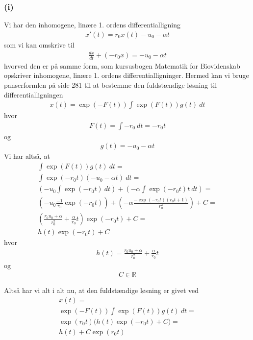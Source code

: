 \documentclass[12pt]{article}
\begin{document}
\subsubsection{(i)}

Vi har den inhomogene, linære 1. ordens differentialligning
\begin{align}
x'(t) = r_0x(t) - u_0 - \alpha t
\end{align}
som vi kan omskrive til  
\begin{align}
\frac{dx}{dt} + (-r_0 x) = - u_0 - \alpha t
\end{align}
hvorved den er på samme form, som kursusbogen Matematik for Biovidenskab opskriver inhomogene, linære 1. ordens differentialligninger. Hermed kan vi bruge panserformlen på side 281 til at bestemme den fuldstændige løsning til differentialligningen
\begin{align}
x(t) = \exp(-F(t)) \int \exp(F(t))g(t)\ dt  
\end{align}
hvor 
\begin{align}
F(t) = \int - r_0\ dt = -r_0t
\end{align}
og 
\begin{align}
g(t) = -u_0 -\alpha t
\end{align}
Vi har altså, at 
\begin{align}
\int \exp(F(t))g(t)\ dt = \\ 
\int \exp(-r_0t)(-u_0 -\alpha t) \ dt = \\ 
\left(-u_0\int \exp(-r_0t) \ dt\right) + \left( - \alpha \int \exp(-r_0t) t \ dt\right) = \\
\left(-u_0 \frac{-1}{r_0} \exp (-r_0t) \right) + \left( - \alpha \frac{-\exp(-r_0t)(r_0t+1)}{r_0^2}\right) + C = \\
\left(\frac{r_0u_0 + \alpha}{r_0^2} + \frac{\alpha }{r_0}t \right)\exp(-r_0t) + C  = \\
h(t)\exp(-r_0t) + C  
\end{align}
hvor 
\begin{align}
h(t) = \frac{r_0u_0 + \alpha}{r_0^2} + \frac{\alpha }{r_0}t 
\end{align}
og
\begin{align}
C \in \mathbb{R}
\end{align}

Altså har vi alt i alt nu, at den fuldstændige løsning er givet ved 
\begin{align}
x(t) = \\ 
\exp(-F(t)) \int \exp(F(t))g(t)\ dt = \\ 
\exp(r_0t) \bigg( h(t)\exp(-r_0t) + C  \bigg) = \\
h(t) + C\exp(r_0t)
\end{align}
\end{document}
